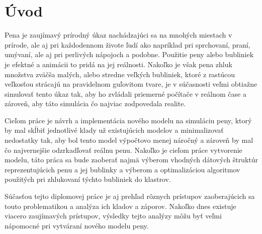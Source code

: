 \chapter{Úvod}\label{chap:intro}

Pena je zaujímavý prírodný úkaz nachádzajúci sa na mnohých miestach v prírode, ale aj pri každodennom živote ľudí ako napríklad pri sprchovaní, praní, umývaní, ale aj pri perlivých nápojoch a podobne. Použitie peny alebo bubliniek je efektné a animácii to pridá na jej reálnosti. Nakoľko je však pena zhluk množstva zväčša malých, alebo stredne veľkých bubliniek, ktoré z rastúcou veľkosťou strácajú na pravidelnom guľovitom tvare, je v súčasnosti veľmi obtiažne simulovať tento úkaz tak, aby ho zvládali priemerné počítače v reálnom čase a zároveň, aby táto simulácia čo najviac zodpovedala realite.

Cieľom práce je návrh a implementácia nového modelu na simuláciu peny, ktorý by mal skĺbiť jednotlivé klady už existujúcich modelov a minimalizovať nedostatky tak, aby bol tento model výpočtovo menej náročný a zároveň by mal čo najvernejšie odzrkadľovať reálnu penu. Nakoľko je cieľom práce vytvorenie modelu, táto práca sa bude zaoberať najmä výberom vhodných dátových štruktúr reprezentujúcich penu a jej bublinky a výberom a optimalizáciou algoritmov použitých pri zhlukovaní týchto bubliniek do klastrov.

Súčasťou tejto diplomovej práce je aj prehľad rôznych prístupov zaoberajúcich sa touto problematikou a analýza ich kladov a záporov. Nakoľko dnes existuje viacero zaujímavých prístupov, výsledky tejto analýzy môžu byť veľmi nápomocné pri vytváraní nového modelu peny.